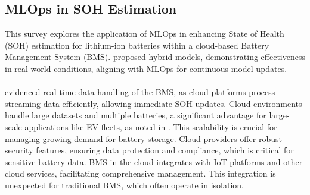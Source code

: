 \subsection{MLOps in SOH Estimation}
This survey explores the application of MLOps in enhancing State of Health (SOH) estimation for lithium-ion batteries within a cloud-based Battery Management System (BMS). \cite{en15051692} proposed hybrid models, demonstrating effectiveness in real-world conditions, aligning with MLOps for continuous model updates.\\ \\ \cite{8095896} evidenced real-time data handling of the BMS, as cloud platforms process streaming data efficiently, allowing immediate SOH updates. Cloud environments handle large datasets and multiple batteries, a significant advantage for large-scale applications like EV fleets, as noted in \cite{batteries8020019}. This scalability is crucial for managing growing demand for battery storage. Cloud providers offer robust security features, ensuring data protection and compliance, which is critical for sensitive battery data. BMS in the cloud integrates with IoT platforms and other cloud services, facilitating comprehensive management. This integration is unexpected for traditional BMS, which often operate in isolation.